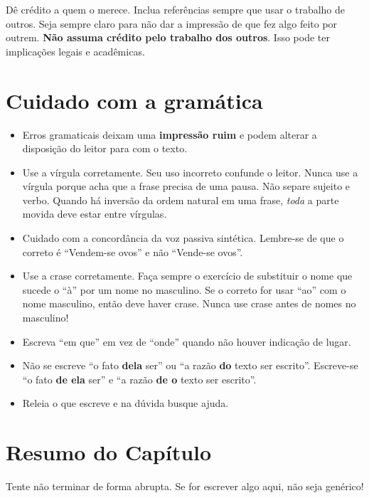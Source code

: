 Dê crédito a quem o merece. Inclua referências sempre que usar o trabalho de outros. Seja sempre claro para não dar a impressão de que fez algo feito por outrem. \textbf{Não assuma crédito pelo trabalho dos outros}. Isso pode ter implicações legais e acadêmicas.

\section{Cuidado com a gramática}

\begin{itemize}

\item Erros gramaticais deixam uma \textbf{impressão ruim} e podem alterar a disposição do leitor para com o texto.  

\item Use a vírgula corretamente. Seu uso incorreto confunde o leitor. Nunca use a vírgula porque acha que a frase precisa de uma pausa. Não separe sujeito e verbo. Quando há inversão da ordem natural em uma frase, \emph{toda} a parte movida deve estar entre vírgulas.

\item Cuidado com a concordância da voz passiva sintética. Lembre-se de que o correto é ``Vendem-se ovos'' e não ``Vende-se ovos''.

\item Use a crase corretamente. Faça sempre o exercício de substituir o nome que sucede o ``à'' por um nome no masculino. Se o correto for usar ``ao'' com o nome masculino, então deve haver crase. Nunca use crase antes de nomes no masculino!

\item Escreva ``em que'' em vez de ``onde'' quando não houver indicação de lugar.

\item Não se escreve ``o fato \textbf{dela} ser'' ou ``a razão \textbf{do} texto ser escrito''. Escreve-se ``o fato \textbf{de ela} ser'' e ``a razão \textbf{de o} texto ser escrito''.

\item Releia o que escreve e na dúvida busque ajuda.

\end{itemize}

\section{Resumo do Capítulo}
\label{sec:metodo1b}

Tente não terminar de forma abrupta. Se for escrever algo aqui, não seja genérico!


\clearpage